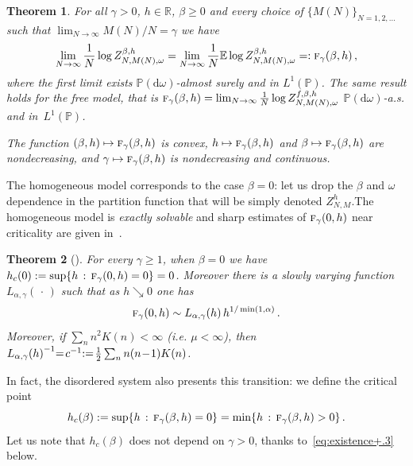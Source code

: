 \documentclass[10pt]{amsart}
\newtheorem{theo}{Theorem}[section]
\theoremstyle{definition}\newtheorem{defi}[theo]{Definition}\newtheorem{rema}[theo]{Remark}\newtheorem{exam}[theo]{Example}\newtheorem{exem}[theo]{Example}\newtheorem{nota}[theo]{Notation}
\newcommand{\ga}{\alpha}
\newcommand{\gb}{\beta}
\newcommand{\go}{\omega}
\newcommand{\dd}{\mathrm{d}}
\newcommand{\tf}{\textsc{f}} %
\newcommand{\bbE}{\ensuremath{\mathbb{E}}}
\newcommand{\bbP}{\ensuremath{\mathbb{P}}}
\newcommand{\bbR}{\ensuremath{\mathbb{R}}}
\newcommand*{\Mk}{\mkern -2mu}
\begin{document}
\begin{theo}\label{th:fq}
For all $\gamma>0$, $h \in \bbR$, $\beta \ge 0$ and every choice of $\{M(N)\}_{N=1,2, \ldots}$ such that $\lim_{N\to\infty} M(N)/N=\gamma$ we have
\begin{equation}\label{eq:saf}
\lim_{N\to\infty} \frac{1}{N} \log Z^{\gb,h}_{N,M(N),\omega} = \lim_{N\to\infty} \frac{1}{N} \bbE \log Z^{\gb,h}_{N,M(N),\omega} =: \tf_{\gamma}(\beta,h)\,,
\end{equation}
where the first limit exists $\bbP(\dd \go)$-almost surely and in $L^1(\bbP)$. The same result holds for the free model, that is $\tf_{\gamma}(\beta,h) = \lim_{N\to\infty} \frac{1}{N} \log Z^{f,\gb,h}_{N,M(N),\omega}$ $\bbP(\dd \go)$-a.s. and in~$L^1(\bbP)$.

The function $(\gb,h) \mapsto \tf_{\gamma}(\gb,h)$ is convex, $h\mapsto \tf_{\gamma}(\gb,h)$ and $\gb\mapsto \tf_{\gamma}(\gb,h)$ are nondecreasing, and $\gamma \mapsto \tf_{\gamma}(\gb,h)$ is nondecreasing and continuous.
\end{theo}

The homogeneous model corresponds to the case $\beta = 0$: let us drop the $\gb$ and $\go$ dependence in the partition function that will be simply denoted $Z_{N, M}^h$.\linebreak The homogeneous model is \emph{exactly solvable} and sharp estimates of $\tf_\gamma (0,h)$ near criticality are given in~\cite{cf:GK}.

\begin{theo}[\cite{cf:GK}]\label{th:beta0}
For every $\gamma \ge 1$, when $\beta=0$ we have $h_c(0) := \sup\{ h\,:\,\tf_{\gamma}(0,h)=0\}= 0$. Moreover there is a slowly varying function $L_{\ga, \gamma}({\,\cdot\,})$ such that as $h \searrow 0$ one has
\begin{equation}
\tf_\gamma (0,h) \sim L_{\ga,\gamma} (h)\,h^{1/ \min (1, \ga)}\,.
\end{equation}
Moreover, if $\sum_n n^2 K(n) \!<\! \infty$ (i.e. $\mu\!<\!\infty$), then ${L_{\ga,\gamma}(h)}^{-1} \Mk\!=\! c^{-1} \!\Mk:=\! \frac{1}{2} \sum_{n } n(n\!-\!1) K(n)$.
\end{theo}

In fact, the disordered system also presents this transition: we define the critical point
\begin{equation}
h_c(\beta) := \sup \lbrace h\,:\,\tf_\gamma (\beta,h) = 0 \rbrace = \min \lbrace h\,:\,\tf_\gamma (\beta,h) >0 \rbrace\,.
\end{equation}
Let us note that $h_c(\gb)$ does not depend on $\gamma >0$, thanks to~\eqref{eq:existence+.3} below.
\end{document}
